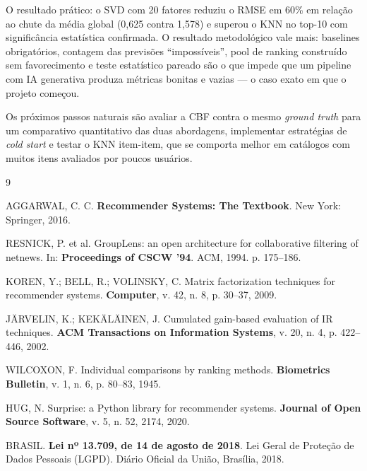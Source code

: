 \documentclass[12pt,a4paper]{article}
\begin{document}
O resultado prático: o SVD com 20 fatores reduziu o RMSE em 60\% em relação ao chute da média global (0,625 contra 1,578) e superou o KNN no top-10 com significância estatística confirmada. O resultado metodológico vale mais: baselines obrigatórios, contagem das previsões ``impossíveis'', pool de ranking construído sem favorecimento e teste estatístico pareado são o que impede que um pipeline com IA generativa produza métricas bonitas e vazias --- o caso exato em que o projeto começou.

Os próximos passos naturais são avaliar a CBF contra o mesmo \textit{ground truth} para um comparativo quantitativo das duas abordagens, implementar estratégias de \textit{cold start} e testar o KNN item-item, que se comporta melhor em catálogos com muitos itens avaliados por poucos usuários.

\begin{thebibliography}{9}

AGGARWAL, C. C. \textbf{Recommender Systems: The Textbook}. New York: Springer, 2016.

RESNICK, P. et al. GroupLens: an open architecture for collaborative filtering of netnews. In: \textbf{Proceedings of CSCW '94}. ACM, 1994. p. 175--186.

KOREN, Y.; BELL, R.; VOLINSKY, C. Matrix factorization techniques for recommender systems. \textbf{Computer}, v. 42, n. 8, p. 30--37, 2009.

JÄRVELIN, K.; KEKÄLÄINEN, J. Cumulated gain-based evaluation of IR techniques. \textbf{ACM Transactions on Information Systems}, v. 20, n. 4, p. 422--446, 2002.

WILCOXON, F. Individual comparisons by ranking methods. \textbf{Biometrics Bulletin}, v. 1, n. 6, p. 80--83, 1945.

HUG, N. Surprise: a Python library for recommender systems. \textbf{Journal of Open Source Software}, v. 5, n. 52, 2174, 2020.

BRASIL. \textbf{Lei nº 13.709, de 14 de agosto de 2018}. Lei Geral de Proteção de Dados Pessoais (LGPD). Diário Oficial da União, Brasília, 2018.

\end{thebibliography}
\end{document}
